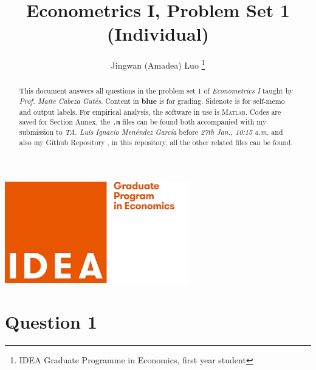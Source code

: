 \documentclass[9pt]{tufte-handout}
\title{Econometrics I, Problem Set 1 (Individual)}
\author{Jingwan (Amadea) Luo \thanks{IDEA Graduate Programme in Economics, first year student}}
\begin{document}
\maketitle

\begin{marginfigure}
	\includegraphics[scale = 0.35]{IDEA.png}
\end{marginfigure}

\begin{abstract}
	This document answers all questions in the problem set 1 of \textit{Econometrics I} taught by \textit{Prof. Maite Cabeza Gut\'es}. Content in \textcolor{NavyBlue}{\textbf{blue}} is for grading. Sidenote is for self-memo and output labels. For empirical analysis, the software in use is \textsc{Matlab}. Codes are saved for Section Annex, the \texttt{.m} files can be found both accompanied with my submission to \textit{TA. Luis Ignacio Men\'endez Garc\'ia} before \textit{27th Jan., 10:15 a.m.} and also my Github Repository , in this repository, all the other related files can be found.
\end{abstract}
\section{Question 1}
\end{document}
